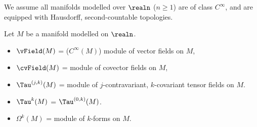 \documentclass[../main-v2-manifolds.tex]{subfiles}
\begin{document}
\graphicspath{{../images/}{images/}} 
\begin{remark}
    We assume all manifolds modelled over $\realn$ ($n\geq 1$) are of class $C^\infty$, and are equipped with Hausdorff, second-countable topologies.
\end{remark}
Let $M$ be a manifold modelled on $\realn$.
\begin{itemize}
    \item $\vField(M)$ = ($C^\infty(M)$) module of vector fields on $M$,
    \item $\cvField(M)$ = module of covector fields on $M$,
    \item $\Tau^{(j,k)}(M)$ = module of $j$-contravariant, $k$-covariant tensor fields on $M$.
    \item $\Tau^{k}(M)$ = $\Tau^{(0,k)}(M)$.
    \item $\Omega^k(M)$ = module of $k$-forms on $M$.
\end{itemize}
\end{document}
